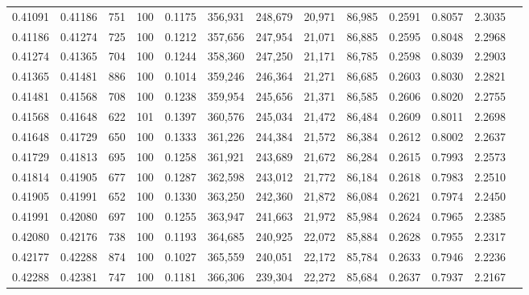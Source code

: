 \begin{tabular}{rrrrrrrrrrrrr}
0.41091 & 0.41186 &   751 & 100 &                                     0.1175 & 356,931 & 248,679 &  20,971 &  86,985 & 0.2591 & 0.8057 & 2.3035 \\
0.41186 & 0.41274 &   725 & 100 &                                     0.1212 & 357,656 & 247,954 &  21,071 &  86,885 & 0.2595 & 0.8048 & 2.2968 \\
0.41274 & 0.41365 &   704 & 100 &                                     0.1244 & 358,360 & 247,250 &  21,171 &  86,785 & 0.2598 & 0.8039 & 2.2903 \\
0.41365 & 0.41481 &   886 & 100 &                                     0.1014 & 359,246 & 246,364 &  21,271 &  86,685 & 0.2603 & 0.8030 & 2.2821 \\
0.41481 & 0.41568 &   708 & 100 &                                     0.1238 & 359,954 & 245,656 &  21,371 &  86,585 & 0.2606 & 0.8020 & 2.2755 \\
0.41568 & 0.41648 &   622 & 101 &                                     0.1397 & 360,576 & 245,034 &  21,472 &  86,484 & 0.2609 & 0.8011 & 2.2698 \\
0.41648 & 0.41729 &   650 & 100 &                                     0.1333 & 361,226 & 244,384 &  21,572 &  86,384 & 0.2612 & 0.8002 & 2.2637 \\
0.41729 & 0.41813 &   695 & 100 &                                     0.1258 & 361,921 & 243,689 &  21,672 &  86,284 & 0.2615 & 0.7993 & 2.2573 \\
0.41814 & 0.41905 &   677 & 100 &                                     0.1287 & 362,598 & 243,012 &  21,772 &  86,184 & 0.2618 & 0.7983 & 2.2510 \\
0.41905 & 0.41991 &   652 & 100 &                                     0.1330 & 363,250 & 242,360 &  21,872 &  86,084 & 0.2621 & 0.7974 & 2.2450 \\
0.41991 & 0.42080 &   697 & 100 &                                     0.1255 & 363,947 & 241,663 &  21,972 &  85,984 & 0.2624 & 0.7965 & 2.2385 \\
0.42080 & 0.42176 &   738 & 100 &                                     0.1193 & 364,685 & 240,925 &  22,072 &  85,884 & 0.2628 & 0.7955 & 2.2317 \\
0.42177 & 0.42288 &   874 & 100 &                                     0.1027 & 365,559 & 240,051 &  22,172 &  85,784 & 0.2633 & 0.7946 & 2.2236 \\
0.42288 & 0.42381 &   747 & 100 &                                     0.1181 & 366,306 & 239,304 &  22,272 &  85,684 & 0.2637 & 0.7937 & 2.2167 \\

\end{tabular}
